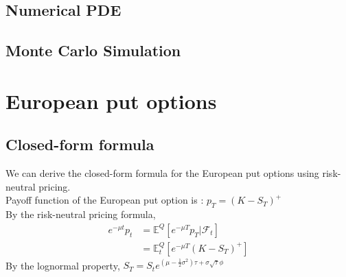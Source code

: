 \subsection{Numerical PDE}
\newpage
\subsection{Monte Carlo Simulation}
\newpage

\section{European put options}

\subsection{Closed-form formula}
We can derive the closed-form formula for the European put options using risk-neutral pricing.\\
Payoff function of the European put option is : $p_{T} = (K - S_{T})^{+}$\\
By the risk-neutral pricing formula,
\begin{equation}
\begin{split}
e^{-\mu t}p_{t}
&= \mathbb{E}^{Q}[e^{-\mu T}p_{T} | \mathcal{F}_{t}]\\
&= \mathbb{E}_{t}^{Q}[e^{-\mu T}(K - S_{T})^{+}]
\end{split}
\end{equation}
By the lognormal property, \quad
$S_{T} = S_{t}e^{(\mu - \frac{1}{2}\sigma^{2})\tau + \sigma\sqrt{\tau}\phi}$
